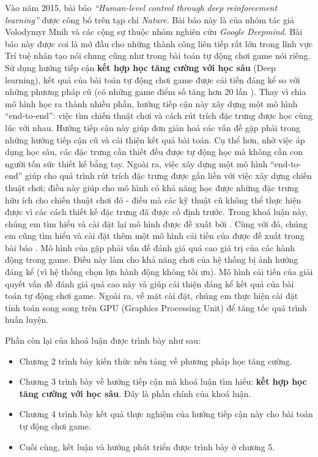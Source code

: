 Vào năm 2015, bài báo \textit{``Human-level control through deep reinforcement learning''} \cite{mnihdqn2015} được công bố trên tạp chí \textit{Nature}.
Bài báo này là của nhóm tác giả Volodymyr Mnih và các cộng sự thuộc nhóm nghiên cứu \textit{Google Deepmind}.
Bài báo này được coi là mở đầu cho những thành công liên tiếp rất lớn trong lĩnh vực Trí tuệ nhân tạo nói chung cũng như trong bài toán tự động chơi game nói riêng.
Sử dụng hướng tiếp cận \textbf{kết hợp học tăng cường với học sâu} (Deep learning), kết quả của bài toán tự động chơi game được cải tiến đáng kể so với những phương pháp cũ (có những game điểm số tăng hơn 20 lần \cite{mnihdqn2015}).
Thay vì chia mô hình học ra thành nhiều phần, hướng tiếp cận này xây dựng một mô hình ``end-to-end'': việc tìm chiến thuật chơi và cách rút trích đặc trưng được học cùng lúc với nhau.
Hướng tiếp cận này giúp đơn giản hoá các vấn đề gặp phải trong những hướng tiếp cận cũ và cải thiện kết quả bài toán.
Cụ thể hơn, nhờ việc áp dụng học sâu, các đặc trưng cần thiết đều được tự động học mà không cần con người tốn sức thiết kế bằng tay.
Ngoài ra, việc xây dựng một mô hình ``end-to-end'' giúp cho quá trình rút trích đặc trưng được gắn liền với việc xây dựng chiến thuật chơi; điều này giúp cho mô hình có khả năng học được những đặc trưng hữu ích cho chiến thuật chơi đó - điều mà các kỹ thuật cũ không thể thực hiện được vì các cách thiết kế đặc trưng đã được cố định trước.
Trong khoá luận này, chúng em tìm hiểu và cài đặt lại mô hình được đề xuất bởi \cite{mnihdqn2015}.
Cùng với đó, chúng em cũng tìm hiểu và cài đặt thêm một mô hình cải tiến của \cite{mnihdqn2015} được đề xuất trong bài báo \cite{van2015deep}.
Mô hình của \cite{mnihdqn2015} gặp phải vấn đề đánh giá quá cao giá trị của các hành động trong game.
Điều này làm cho khả năng chơi của hệ thống bị ảnh hưởng đáng kể (vì hệ thống chọn lựa hành động không tối ưu).
Mô hình cải tiến của \cite{van2015deep} giải quyết vấn đề đánh giá quá cao này và giúp cải thiện đáng kể kết quả của bài toán tự động chơi game.
Ngoài ra, về mặt cài đặt, chúng em thực hiện cài đặt tính toán song song trên GPU (Graphics Processing Unit) để tăng tốc quá trình huấn luyện.

\medskip
Phần còn lại của khoá luận được trình bày như sau:
\begin{itemize}
	\item Chương 2 trình bày kiến thức nền tảng về phương pháp học tăng cường.
	\item Chương 3 trình bày về hướng tiếp cận mà khoá luận tìm hiểu: \textbf{kết hợp học tăng cường với học sâu}.
	Đây là phần chính của khoá luận.
	\item Chương 4 trình bày kết quả thực nghiệm của hướng tiếp cận này cho bài toán tự động chơi game.
	\item Cuối cùng, kết luận và hướng phát triển được trình bày ở chương 5.
\end{itemize}